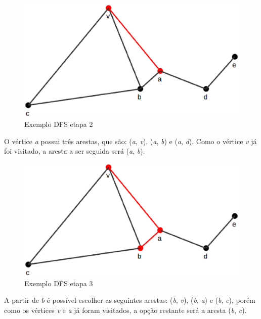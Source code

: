 \begin{figure}[!h]
	\centering
	\includegraphics[scale=0.4]{figuras/capitulo1/dfs/dfs2.eps}
	\caption{Exemplo DFS etapa 2}
	\label{dfs2}
\end{figure}

O vértice \textit{a} possui três arestas, que são: (\textit{a}, \textit{v}), (\textit{a}, \textit{b}) e (\textit{a}, \textit{d}). Como o vértice \textit{v} já foi visitado, a aresta a ser seguida será (\textit{a}, \textit{b}).

\begin{figure}[!h]
	\centering
	\includegraphics[scale=0.4]{figuras/capitulo1/dfs/dfs3.eps}
	\caption{Exemplo DFS etapa 3}
	\label{dfs3}
\end{figure}

A partir de \textit{b} é possível escolher as seguintes arestas: (\textit{b}, \textit{v}), (\textit{b}, \textit{a}) e (\textit{b}, \textit{c}), porém como os vértices \textit{v} e \textit{a} já foram visitados, a opção restante será a aresta (\textit{b}, \textit{c}).

